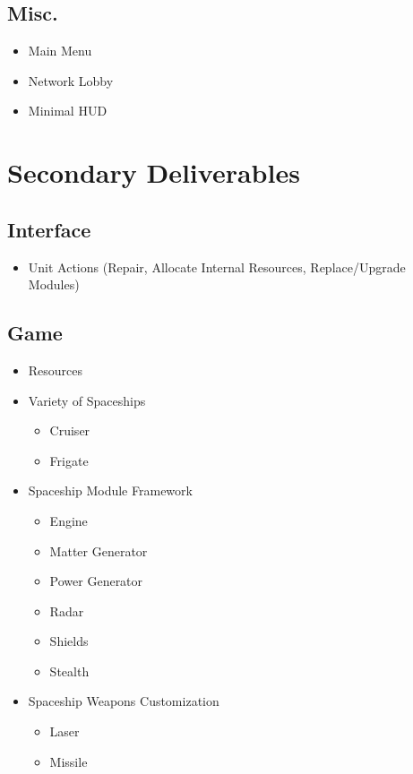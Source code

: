 \subsection{Misc.}

\begin{itemize}
	\item Main Menu
	\item Network Lobby
	\item Minimal HUD
\end{itemize}

\section{Secondary Deliverables}

\subsection{Interface}

\begin{itemize}
	\item Unit Actions (Repair, Allocate Internal Resources, Replace/Upgrade Modules)
\end{itemize}

\subsection{Game}

\begin{itemize}
	\item Resources
	\item Variety of Spaceships
	\begin{itemize}
		\item Cruiser
		\item Frigate
	\end{itemize}
	\item Spaceship Module Framework
	\begin{itemize}
		\item Engine
		\item Matter Generator
		\item Power Generator
		\item Radar
		\item Shields
		\item Stealth
	\end{itemize}
	\item Spaceship Weapons Customization
	\begin{itemize}
		\item Laser
		\item Missile
	\end{itemize}
\end{itemize}

